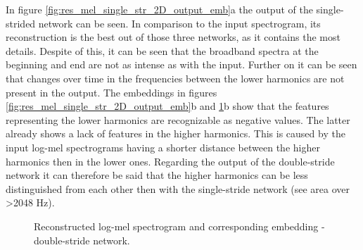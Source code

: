 In figure \ref{fig:res_mel_single_str_2D_output_emb}a the output of the single-strided network can be seen. In comparison to the input spectrogram, its reconstruction is the best out of those three networks, as it contains the most details. Despite of this, it can be seen that the broadband spectra at the beginning and end are not as intense as with the input. Further on it can be seen that changes over time in the frequencies between the lower harmonics are not present in the output. The embeddings in figures \ref{fig:res_mel_single_str_2D_output_emb}b and \ref{fig:res_mel_double_str_2D_output_emb}b show that the features representing the lower harmonics are recognizable as negative values. The latter already shows a lack of features in the higher harmonics. This is caused by the input log-mel spectrograms having a shorter distance between the higher harmonics then in the lower ones. Regarding the output of the double-stride network it can therefore be said that the higher harmonics can be less distinguished from each other then with the single-stride network (see area over >2048 Hz).


\begin{figure}[htb!]
    \centering
    \captionsetup{justification=centering}
    \caption{Reconstructed log-mel spectrogram and corresponding embedding - double-stride network.}
    \label{fig:res_mel_double_str_2D_output_emb}
\end{figure}


